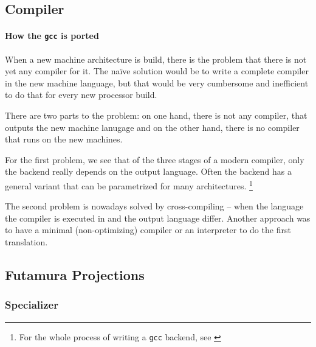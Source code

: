 \subsection{Compiler} %
\label{sub:Compiler}
\paragraph{How the {\tt gcc} is ported} %
\label{par:gcc}
When a new machine architecture is build, there is the problem that there is 
not yet any compiler for it. The naïve solution would be to write a complete 
compiler in the new machine language, but that would be very cumbersome and 
inefficient to do that for every new processor build.

There are two parts to the problem: on one hand, there is not any compiler, 
that outputs the new machine lanugage and on the other hand, there is no 
compiler that runs on the new machines.

For the first problem, we see that of the three stages of a modern compiler,
only the backend really depends on the output language. Often the backend has 
a general variant that can be parametrized for many architectures.
\footnote{For the whole process of writing a {\tt gcc} backend, see \cite{nilsson2000porting}}

The second problem is nowadays solved by cross-compiling -- when the language 
the compiler is executed in and the output language differ. Another approach 
was to have a minimal (non-optimizing) compiler or an interpreter to do the 
first translation.
\subsection{Futamura Projections} %
\label{sub:Futamura}
\subsubsection{Specializer} %
\label{ssub:Specializer}
